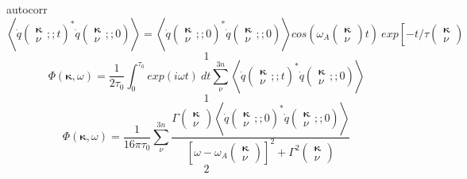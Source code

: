 \noindent autocorr
\[\left\langle {\dot{q}\left( \begin{array}{c}
{\mathbf \kappa } \\ 
\nu  \end{array}
;;t\right)}^*\dot{q}\left( \begin{array}{c}
{\mathbf \kappa } \\ 
\nu  \end{array}
;;0\right)\right\rangle =\left\langle {\dot{q}\left( \begin{array}{c}
{\mathbf \kappa } \\ 
\nu  \end{array}
;;0\right)}^*\dot{q}\left( \begin{array}{c}
{\mathbf \kappa } \\ 
\nu  \end{array}
;;0\right)\right\rangle {cos \left({\omega }_A\left( \begin{array}{c}
{\mathbf \kappa } \\ 
\nu  \end{array}
\right)t\right)\ }exp\left[-{t}/{\tau \left( \begin{array}{c}
{\mathbf \kappa } \\ 
\nu  \end{array}
\right)}\right.\] 
\[1\] 
\[\Phi \left({\mathbf \kappa },\omega \right)=\frac{1}{2{\tau }_0}\int\nolimits^{{\tau }_0}_0{{exp \left(i\omega t\right)\ }dt\sum\limits^{3n}_{\nu }{\left\langle {\dot{q}\left( \begin{array}{c}
{\mathbf \kappa } \\ 
\nu  \end{array}
;;t\right)}^*\dot{q}\left( \begin{array}{c}
{\mathbf \kappa } \\ 
\nu  \end{array}
;;0\right)\right\rangle }}\] 
\[1\] 
\[\Phi \left({\mathbf \kappa },\omega \right)=\frac{1}{16\pi {\tau }_0}\sum\limits^{3n}_{\nu }{\frac{\Gamma \left( \begin{array}{c}
{\mathbf \kappa } \\ 
\nu  \end{array}
\right)\left\langle {\dot{q}\left( \begin{array}{c}
{\mathbf \kappa } \\ 
\nu  \end{array}
;;0\right)}^*\dot{q}\left( \begin{array}{c}
{\mathbf \kappa } \\ 
\nu  \end{array}
;;0\right)\right\rangle }{{\left[{\omega -\omega }_A\left( \begin{array}{c}
{\mathbf \kappa } \\ 
\nu  \end{array}
\right)\right]}^2+{\Gamma }^2\left( \begin{array}{c}
{\mathbf \kappa } \\ 
\nu  \end{array}
\right)}}\] 
\[2\] 



